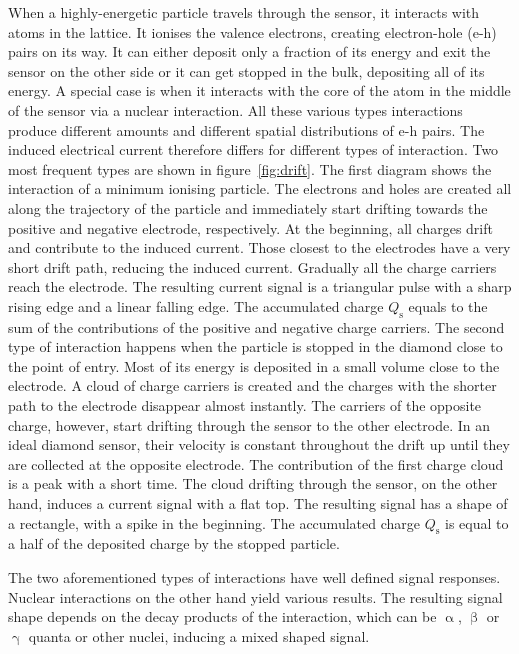 When a highly-energetic particle travels through the sensor, it interacts with atoms in the lattice. It ionises the valence electrons, creating electron-hole (e-h) pairs on its way. It can either deposit only a fraction of its energy and exit the sensor on the other side or it can get stopped in the bulk, depositing all of its energy. A special case is when it interacts with the core of the atom in the middle of the sensor via a nuclear interaction. All these various types interactions produce different amounts and different spatial distributions of e-h pairs. The induced electrical current therefore differs for different types of interaction. Two most frequent types are shown in figure~\ref{fig:drift}. The first diagram shows the interaction of a minimum ionising particle. The electrons and holes are created all along the trajectory of the particle and immediately start drifting towards the positive and negative electrode, respectively. At the beginning, all charges drift and contribute to the induced current. Those closest to the electrodes have a very short drift path, reducing the induced current. Gradually all the charge carriers reach the electrode. The resulting current signal is a triangular pulse with a sharp rising edge and a linear falling edge. The accumulated charge $Q_\mathrm{s}$ equals to the sum of the contributions of the positive and negative charge carriers. The second type of interaction happens when the particle is stopped in the diamond close to the point of entry. Most of its energy is deposited in a small volume close to the electrode. A cloud of charge carriers is created and the charges with the shorter path to the electrode disappear almost instantly. The carriers of the opposite charge, however, start drifting through the sensor to the other electrode. In an ideal diamond sensor, their velocity is constant throughout the drift up until they are collected at the opposite electrode. The contribution of the first charge cloud is a peak with a short time. The cloud drifting through the sensor, on the other hand, induces a current signal with a flat top. The resulting signal has a shape of a rectangle, with a spike in the beginning. %
The accumulated charge $Q_\mathrm{s}$ is equal to a half of the deposited charge by the stopped particle.

The two aforementioned types of interactions have well defined signal responses. Nuclear interactions on the other hand yield various results. The resulting signal shape depends on the decay products of the interaction, which can be $\upalpha$, $\upbeta$ or $\upgamma$ quanta or other nuclei, inducing a mixed shaped signal. 
%


